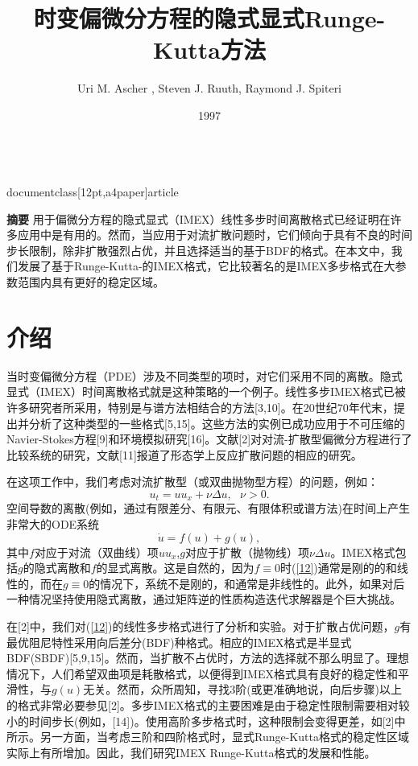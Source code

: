 \\documentclass[12pt,a4paper]{article}
\begin{document}
\title{时变偏微分方程的隐式显式Runge-Kutta方法}
\author{Uri M. Ascher , Steven J. Ruuth, Raymond J. Spiteri}
\date{1997}
\maketitle

\textbf{摘要}
用于偏微分方程的隐式显式（IMEX）线性多步时间离散格式已经证明在许多应用中是有用的。然而，当应用于对流扩散问题时，它们倾向于具有不良的时间步长限制，除非扩散强烈占优，并且选择适当的基于BDF的格式。在本文中，我们发展了基于Runge-Kutta-的IMEX格式，它比较著名的是IMEX多步格式在大参数范围内具有更好的稳定区域。

\section{介绍}
当时变偏微分方程（PDE）涉及不同类型的项时，对它们采用不同的离散。隐式显式（IMEX）时间离散格式就是这种策略的一个例子。线性多步IMEX格式已被许多研究者所采用，特别是与谱方法相结合的方法[3,10]。在20世纪70年代末，提出并分析了这种类型的一些格式[5,15]。这些方法的实例已成功应用于不可压缩的Navier-Stokes方程[9]和环境模拟研究[16]。文献[2]对对流-扩散型偏微分方程进行了比较系统的研究，文献[11]报道了形态学上反应扩散问题的相应的研究。

在这项工作中，我们考虑对流扩散型（或双曲抛物型方程）的问题，例如：
\begin{equation}
u_{t}=uu_{x}+\nu\Delta u,~~~\nu >0.
\label{11}
\end{equation}
空间导数的离散(例如，通过有限差分、有限元、有限体积或谱方法)在时间上产生非常大的ODE系统
\begin{equation}
\dot{u}=f(u)+g(u),
\label{12}
\end{equation}
其中$f$对应于对流（双曲线）项$uu_{x}$,$g$对应于扩散（抛物线）项$\nu\Delta u$。IMEX格式包括$g$的隐式离散和$f$的显式离散。这是自然的，因为$f\equiv 0$时(\ref{12})通常是刚的的和线性的，而在$g\equiv 0$的情况下，系统不是刚的，和通常是非线性的。此外，如果对后一种情况坚持使用隐式离散，通过矩阵逆的性质构造迭代求解器是个巨大挑战。

在[2]中，我们对(\ref{12})的线性多步格式进行了分析和实验。对于扩散占优问题，$g$有最优阻尼特性采用向后差分(BDF)种格式。相应的IMEX格式是半显式BDF(SBDF)[5,9,15]。然而，当扩散不占优时，方法的选择就不那么明显了。理想情况下，人们希望双曲项是耗散格式，以便得到IMEX格式具有良好的稳定性和平滑性，与$g(u)$无关。然而，众所周知，寻找3阶(或更准确地说，向后步骤)以上的格式非常必要参见[2]。多步IMEX格式的主要困难是由于稳定性限制需要相对较小的时间步长(例如，[14])。使用高阶多步格式时，这种限制会变得更差，如[2]中所示。另一方面，当考虑三阶和四阶格式时，显式Runge-Kutta格式的稳定性区域实际上有所增加。因此，我们研究IMEX Runge-Kutta格式的发展和性能。
\end{document}
